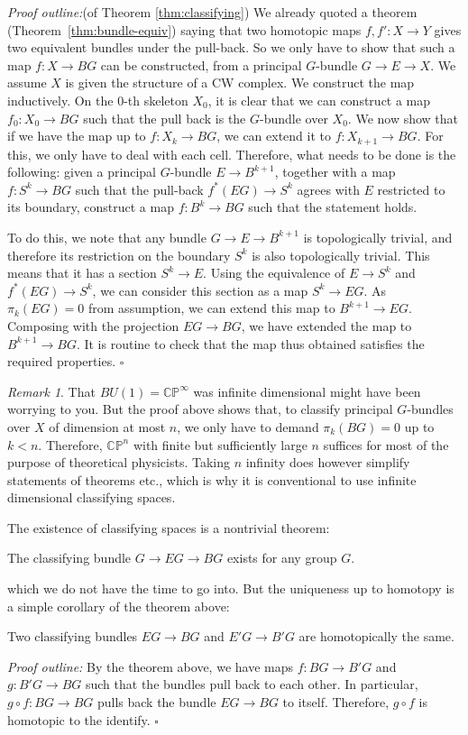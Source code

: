 \documentclass[12pt]{article}
\numberwithin{equation}{section}
\theoremstyle{remark}
\newtheorem{remark}[definition]{Remark}
\renewenvironment{proof}{\noindent\textsl{Proof outline:}}{\hfill$\square$}
\def\CP{\mathbb{CP}}
\begin{document}
\begin{proof}(of Theorem \ref{thm:classifying})
We already quoted a theorem (Theorem~\ref{thm:bundle-equiv}) saying that 
two homotopic maps $f,f': X\to Y$ gives two equivalent bundles under the pull-back.
So we only have to show that such a map $f:X\to BG$ can be constructed, 
from a principal $G$-bundle $G\to E\to X$.
We assume $X$ is given  the structure of a CW complex.
We construct the map inductively.
On the 0-th skeleton $X_0$, it is clear that we can construct a map $f_0: X_0\to BG$ such that the pull back is the $G$-bundle over $X_0$.
We now show that if we have the map up to $f:X_k\to BG$,
we can extend it to $f: X_{k+1}\to BG$.
For this, we only have to deal with each cell.
Therefore, what needs to be done is the following:
given a principal $G$-bundle $E\to B^{k+1}$,
together with a map $f: S^k \to BG$ such that the pull-back $f^*(EG)\to S^k$ agrees with $E$ restricted to its boundary,
construct a map $f:B^k\to BG$ such that the statement holds.

To do this, we note that any bundle $G\to E\to B^{k+1}$ is topologically trivial, 
and therefore its restriction on the boundary $S^k$ is also topologically trivial.
This means that it has a section $S^k \to E$.
Using the equivalence of $E\to S^k$ and $f^*(EG)\to S^k$,
we can consider this section as a map $S^k \to EG$.
As $\pi_{k}(EG)=0$ from assumption, we can extend this map to $B^{k+1}\to EG$.
Composing with the projection $EG\to BG$, we have extended the map to $B^{k+1}\to BG$.
It is routine to check that the map thus obtained satisfies the required properties.
\end{proof}

\begin{remark}
That $BU(1)=\CP^\infty$ was infinite dimensional might have been worrying to you.
But the proof above shows that, to classify principal $G$-bundles over $X$ of dimension at most $n$,
we only have to demand $\pi_{k}(BG)=0$ up to $k<n$.
Therefore, $\CP^n$ with finite but sufficiently large $n$ suffices for most of the purpose of theoretical physicists.
Taking $n$ infinity does however simplify statements of theorems etc., 
which is why it is conventional to use infinite dimensional classifying spaces.
\end{remark}

The existence of classifying spaces is a nontrivial theorem:
\begin{theorem}
The classifying bundle $G\to EG\to BG$ exists for any group $G$.
\end{theorem}
which we do not have the time to go into.
But the uniqueness up to homotopy is a simple corollary of the theorem above:
\begin{proposition}
Two classifying bundles $EG\to BG$ and $E'G\to B'G$ are homotopically the same.
\end{proposition}
\begin{proof}
By the theorem above, we have maps $f:BG\to B'G$ and $g:B'G\to BG$ 
such that the bundles pull back to each other. 
In particular, $g\circ f: BG\to BG$ pulls back the bundle $EG\to BG$ to itself.
Therefore, $g\circ f$ is homotopic to the identify.
\end{proof}
\end{document}

